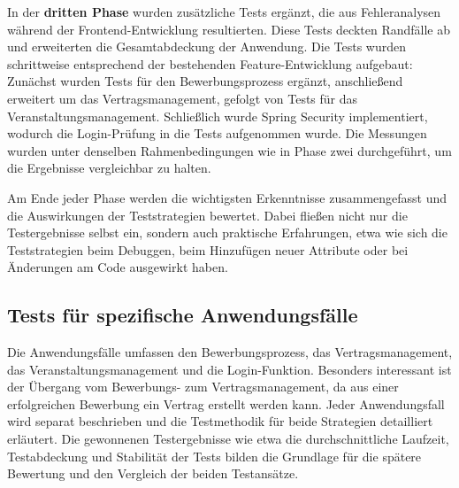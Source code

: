 In der \textbf{dritten Phase} wurden zusätzliche Tests ergänzt, die aus Fehleranalysen während der Frontend-Entwicklung resultierten. Diese Tests deckten Randfälle ab und erweiterten die Gesamtabdeckung der Anwendung. Die Tests wurden schrittweise entsprechend der bestehenden Feature-Entwicklung aufgebaut: Zunächst wurden Tests für den Bewerbungsprozess ergänzt, anschließend erweitert um das Vertragsmanagement, gefolgt von Tests für das Veranstaltungsmanagement. Schließlich wurde Spring Security implementiert, wodurch die Login-Prüfung in die Tests aufgenommen wurde. Die Messungen wurden unter denselben Rahmenbedingungen wie in Phase zwei durchgeführt, um die Ergebnisse vergleichbar zu halten.

Am Ende jeder Phase werden die wichtigsten Erkenntnisse zusammengefasst und die Auswirkungen der Teststrategien bewertet. Dabei fließen nicht nur die Testergebnisse selbst ein, sondern auch praktische Erfahrungen, etwa wie sich die Teststrategien beim Debuggen, beim Hinzufügen neuer Attribute oder bei Änderungen am Code ausgewirkt haben.



\subsection{Tests für spezifische Anwendungsfälle}

Die Anwendungsfälle umfassen den Bewerbungsprozess, das Vertragsmanagement, das Veranstaltungsmanagement und die Login-Funktion. Besonders interessant ist der Übergang vom Bewerbungs- zum Vertragsmanagement, da aus einer erfolgreichen Bewerbung ein Vertrag erstellt werden kann. Jeder Anwendungsfall wird separat beschrieben und die Testmethodik für beide Strategien detailliert erläutert. Die gewonnenen Testergebnisse wie etwa die durchschnittliche Laufzeit, Testabdeckung und Stabilität der Tests bilden die Grundlage für die spätere Bewertung und den Vergleich der beiden Testansätze. 

